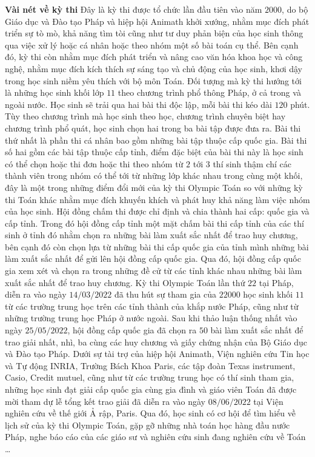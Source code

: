 \begin{multicols}{2}
	\textbf{\color{cackithi}Vài nét về kỳ thi}
	\vskip 0.05cm
	Đây là kỳ thi được tổ chức lần đầu tiên vào năm $2000$, do bộ Giáo dục và Đào tạo Pháp và hiệp hội Animath khởi xướng, nhằm mục đích phát triển sự tò mò, khả năng tìm tòi cũng như tư duy phản biện của học sinh thông qua việc xử lý hoặc cá nhân hoặc theo nhóm một số bài toán cụ thể. Bên cạnh đó, kỳ thi còn nhằm mục đích phát triển và nâng cao văn hóa khoa học và công nghệ, nhằm mục đích kích thích sự sáng tạo và chủ động của học sinh, khơi dậy trong học sinh niềm yêu thích với bộ môn Toán. Đối tượng mà kỳ thi hướng tới là những học sinh khối lớp $11$ theo chương trình phổ thông Pháp, ở cả trong và ngoài nước. 
	\vskip 0.05cm
	Học sinh sẽ trải qua hai bài thi độc lập, mỗi bài thi kéo dài $120$ phút. Tùy theo chương trình mà học sinh theo học, chương trình chuyên biệt hay chương trình phổ quát, học sinh chọn hai trong ba bài tập được đưa ra. Bài thi thứ nhất là phần thi cá nhân bao gồm những bài tập thuộc cấp quốc gia. Bài thi số hai gồm các bài tập thuộc cấp tỉnh, điểm đặc biệt của bài thi này là học sinh có thể chọn hoặc thi đơn hoặc thi theo nhóm từ $2$ tới $3$ thí sinh thậm chí các thành viên trong nhóm có thể tới từ những lớp khác nhau trong cùng một khối, đây là một trong những điểm đổi mới của kỳ thi Olympic Toán so với những kỳ thi Toán khác nhằm mục đích khuyến khích và phát huy khả năng làm việc nhóm của học sinh.
	\vskip 0.05cm 
	Hội đồng chấm thi được chỉ định và chia thành hai cấp: quốc gia và cấp tỉnh. Trong đó hội đồng cấp tỉnh một mặt chấm bài thi cấp tỉnh của các thí sinh ở tỉnh đó nhằm chọn ra những bài làm xuất sắc nhất để trao huy chương, bên cạnh đó còn chọn lựa từ những bài thi cấp quốc gia của tỉnh mình những bài làm xuất sắc nhất để gửi lên hội đồng cấp quốc gia. Qua đó, hội đồng cấp quốc gia xem xét và chọn ra trong những đề cử từ các tỉnh khác nhau những bài làm xuất sắc nhất để trao huy chương. 
	\vskip 0.05cm
	Kỳ thi Olympic Toán lần thứ $22$ tại Pháp, diễn ra vào ngày $14/03/2022$ đã thu hút sự tham gia của $22000$ học sinh khối $11$ từ các trường trung học trên các tỉnh thành của khắp nước Pháp, cũng như từ những trường trung học Pháp ở nước ngoài. Sau khi thảo luận thống nhất vào ngày $25/05/2022$, hội đồng cấp quốc gia đã chọn ra $50$ bài làm xuất sắc nhất để trao giải nhất, nhì, ba cùng các huy chương và giấy chứng nhận của Bộ Giáo dục và Đào tạo Pháp. Dưới sự tài trợ của hiệp hội Animath, Viện nghiên cứu Tin học và Tự động  INRIA, Trường Bách Khoa Paris, các tập đoàn Texas instrument, Casio, Credit mutuel, cũng như từ các trường trung học có thí sinh tham gia, những học sinh đạt giải cấp quốc gia cùng gia đình và giáo viên Toán đã được mời tham dự lễ tổng kết trao giải đã diễn ra vào ngày $08/06/2022$ tại Viện nghiên cứu về thế giới Ả rập, Paris. Qua đó, học sinh có cơ hội để tìm hiểu về lịch sử của kỳ thi Olympic Toán, gặp gỡ những nhà toán học hàng đầu nước Pháp, nghe báo cáo của các giáo sư và nghiên cứu sinh đang nghiên cứu về Toán \ldots 

\end{multicols}

